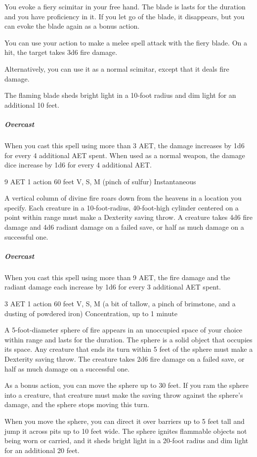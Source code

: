 You evoke a fiery scimitar in your free hand. The blade is lasts for the duration and you have proficiency in it. If you let go of the blade, it disappears, but you can evoke the blade again as a bonus action.

You can use your action to make a melee spell attack with the fiery blade. On a hit, the target takes 3d6 fire damage.

Alternatively, you can use it as a normal scimitar, except that it deals fire damage.

The flaming blade sheds bright light in a 10-foot radius and dim light for an additional 10 feet.

\subparagraph*{Overcast} When you cast this spell using more than 3 AET, the damage increases by 1d6 for every 4 additional AET spent. When used as a normal weapon, the damage dice increase by 1d6 for every 4 additional AET.


{9 AET}
{1 action}
{60 feet}
{V, S, M (pinch of sulfur)}
{Instantaneous}

A vertical column of divine fire roars down from the heavens in a location you specify. Each creature in a 10-foot-radius, 40-foot-high cylinder centered on a point within range must make a Dexterity saving throw. A creature takes 4d6 fire damage and 4d6 radiant damage on a failed save, or half as much damage on a successful one.

\subparagraph*{Overcast} When you cast this spell using more than 9 AET, the fire damage and the radiant damage each increase by 1d6 for every 3 additional AET spent.


{3 AET}
{1 action}
{60 feet}
{V, S, M (a bit of tallow, a pinch of brimstone, and a dusting of powdered iron)}
{Concentration, up to 1 minute}

A 5-foot-diameter sphere of fire appears in an unoccupied space of your choice within range and lasts for the duration. The sphere is a solid object that occupies its space. Any creature that ends its turn within 5 feet of the sphere must make a Dexterity saving throw. The creature takes 2d6 fire damage on a failed save, or half as much damage on a successful one.

As a bonus action, you can move the sphere up to 30 feet. If you ram the sphere into a creature, that creature must make the saving throw against the sphere's damage, and the sphere stops moving this turn.

When you move the sphere, you can direct it over barriers up to 5 feet tall and jump it across pits up to 10 feet wide. The sphere ignites flammable objects not being worn or carried, and it sheds bright light in a 20-foot radius and dim light for an additional 20 feet.

